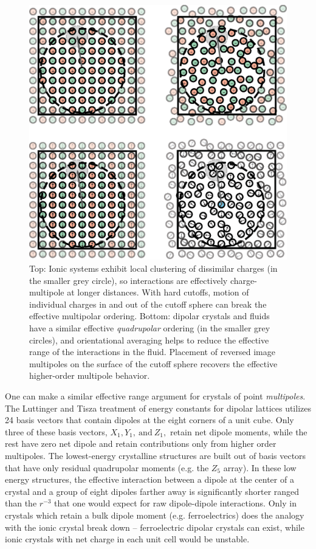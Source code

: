 \begin{figure}
  \centering
  \includegraphics[width=\linewidth]{schematic.eps}
  \caption{Top: Ionic systems exhibit local clustering of dissimilar
    charges (in the smaller grey circle), so interactions are
    effectively charge-multipole at longer distances.  With hard
    cutoffs, motion of individual charges in and out of the cutoff
    sphere can break the effective multipolar ordering.  Bottom:
    dipolar crystals and fluids have a similar effective
    \textit{quadrupolar} ordering (in the smaller grey circles), and
    orientational averaging helps to reduce the effective range of the
    interactions in the fluid.  Placement of reversed image multipoles
    on the surface of the cutoff sphere recovers the effective
    higher-order multipole behavior. \label{fig:schematic1}}
\end{figure}

One can make a similar effective range argument for crystals of point
\textit{multipoles}. The Luttinger and Tisza treatment of energy
constants for dipolar lattices utilizes 24 basis vectors that contain
dipoles at the eight corners of a unit cube.\cite{LT} Only three of
these basis vectors, $X_1, Y_1, \mathrm{~and~} Z_1,$ retain net dipole
moments, while the rest have zero net dipole and retain contributions
only from higher order multipoles.  The lowest-energy crystalline
structures are built out of basis vectors that have only residual
quadrupolar moments (e.g. the $Z_5$ array). In these low energy
structures, the effective interaction between a dipole at the center
of a crystal and a group of eight dipoles farther away is
significantly shorter ranged than the $r^{-3}$ that one would expect
for raw dipole-dipole interactions.  Only in crystals which retain a
bulk dipole moment (e.g. ferroelectrics) does the analogy with the
ionic crystal break down -- ferroelectric dipolar crystals can exist,
while ionic crystals with net charge in each unit cell would be
unstable.

